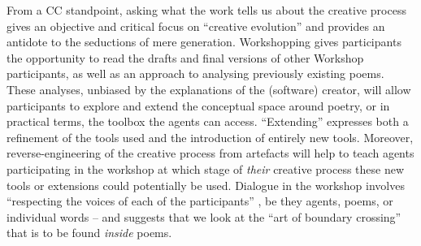 From a CC standpoint, asking what the work tells us about the creative process gives an objective and critical focus on ``creative evolution'' \cite{bergson1983creative} and provides an antidote to the seductions of mere generation.  Workshopping gives participants the opportunity to read the drafts and final versions of other Workshop participants, as well as an approach to analysing previously existing poems.  These analyses, unbiased by the explanations of the (software) creator, will allow participants to explore and extend the conceptual space around poetry, or in practical terms, the toolbox the agents can access. ``Extending'' expresses both a refinement of the tools used and the introduction of entirely new tools. Moreover, reverse-engineering of the creative process from artefacts will help to teach agents participating in the workshop at which stage of \textit{their} creative process these new tools or extensions could potentially be used.  Dialogue in the workshop involves ``respecting the voices of each of the participants'' \cite{seikkula2014open}, be they agents, poems, or individual words -- and suggests that we look at the ``art of boundary crossing'' that is to be found \emph{inside} poems.  %

